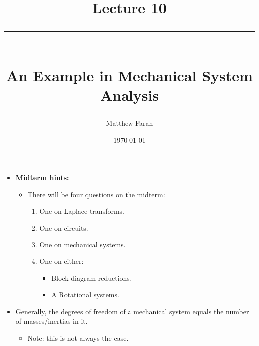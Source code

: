 \documentclass{article}
\date{
	\vspace{-.75em}
	{\large \today}
}
\title{
	\vspace*{-1.5em}
	{\Huge Lecture 10} \\
	\vspace{-1em}
	\rule{\textwidth/4}{.01em} \\
	\vspace{-.25em}
	{\Large An Example in Mechanical System Analysis}
	\vspace{-.75em}
}
\author{
	{\large Matthew Farah}
}
\begin{document}
\maketitle
\pagestyle{fancy}

\fi

\begin{itemize}
	\item \textbf{Midterm hints:}
	\begin{itemize}
		\item There will be four questions on the midterm:
		\begin{enumerate}
			\item One on Laplace transforms.
			\item One on circuits.
			\item One on mechanical systems.
			\item One on either:
			\begin{itemize}
				\item Block diagram reductions.
				\item A Rotational systems.
			\end{itemize}
		\end{enumerate}
	\end{itemize}

	\item Generally, the degrees of freedom of a mechanical system equals the number of masses/inertias in it.
	\begin{itemize}
		\item Note: this is not always the case.
	\end{itemize}
\end{itemize}
\end{document}
